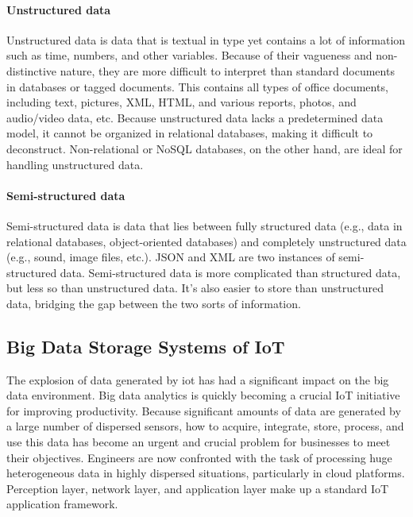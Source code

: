 \paragraph{Unstructured data}

Unstructured data is data that is textual in type yet contains a lot of information such as time, numbers, and other variables. Because of their vagueness and non-distinctive nature, they are more difficult to interpret than standard documents in databases or tagged documents. This contains all types of office documents, including text, pictures, XML, HTML, and various reports, photos, and audio/video data, etc. Because unstructured data lacks a predetermined data model, it cannot be organized in relational databases, making it difficult to deconstruct. Non-relational or NoSQL databases, on the other hand, are ideal for handling unstructured data\cite{structured_data}.

\paragraph{Semi-structured data}

Semi-structured data is data that lies between fully structured data (e.g., data in relational databases, object-oriented databases) and completely unstructured data (e.g., sound, image files, etc.). JSON and XML are two instances of semi-structured data. Semi-structured data is more complicated than structured data, but less so than unstructured data. It's also easier to store than unstructured data, bridging the gap between the two sorts of information\cite{structured_data}.


\subsection{Big Data Storage Systems of IoT}
The explosion of data generated by \ac{iot} has had a significant impact on the big data environment. Big data analytics is quickly becoming a crucial IoT initiative for improving productivity. Because significant amounts of data are generated by a large number of dispersed sensors, how to acquire, integrate, store, process, and use this data has become an urgent and crucial problem for businesses to meet their objectives. Engineers are now confronted with the task of processing huge heterogeneous data in highly dispersed situations, particularly in cloud platforms. Perception layer, network layer, and application layer make up a standard IoT application framework\cite{7600359}.


